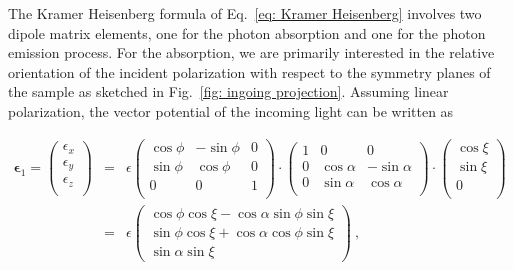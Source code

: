 \documentclass[twocolumn,prb,twocolumn,amsmath,superscriptaddress,nofootinbib,amssymb]{revtex4-1}
\newcommand{\vect}[1]{\boldsymbol{#1}}
\begin{document}
\begin{widetext}
The Kramer Heisenberg formula of Eq.~\ref{eq: Kramer Heisenberg} involves two dipole matrix elements, one for the photon absorption and one for the photon emission process. For the absorption, we are primarily interested in the relative orientation of the incident polarization with respect to the symmetry planes of the sample as sketched in Fig.~\ref{fig: ingoing projection}. Assuming linear polarization, the vector potential of the incoming light can be written as

\begin{eqnarray}\label{eq: polarization vector}
\vect{\epsilon}_1=\left(
          \begin{array}{c}
            \epsilon_x \\
            \epsilon_y \\
            \epsilon_z \\
          \end{array}
        \right)&=&\epsilon\left(
                  \begin{array}{ccc}
                    \cos\phi & -\sin\phi & 0 \\
                    \sin\phi &\cos\phi &  0 \\
                     0 &0 & 1 \\
                  \end{array}
                \right)\cdot
                \left(
                  \begin{array}{ccc}
                    1 & 0 & 0 \\
                    0 &\cos\alpha &  -\sin\alpha \\
                     0 &\sin\alpha & \cos\alpha \\
                  \end{array}
                \right)\cdot\left(
                         \begin{array}{c}
                           \cos\xi \\
                           \sin\xi \\
                           0 \\
                         \end{array}
                       \right)\nonumber\\
                       &=&
                       \epsilon\left(\begin{array}{c} \cos\phi\cos\xi-\cos\alpha\sin\phi\sin\xi\\ \sin\phi\cos\xi+\cos\alpha\cos\phi\sin\xi\\\sin\alpha\sin\xi \end{array}\right)~,
\end{eqnarray}


\end{widetext}
\end{document}
